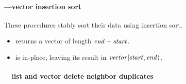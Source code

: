



\paragraph{---vector insertion sort}

\begin{protos}
\end{protos}
%
These procedures stably sort their data using insertion sort.
%
\begin{itemize}
\item {} returns a vector of length \(\var{end}-\var{start}\).
\item {} is in-place, leaving its result in
  \(\var{vector}[\var{start},\var{end})\).
\end{itemize}

\paragraph{---list and vector
  delete neighbor duplicates}

